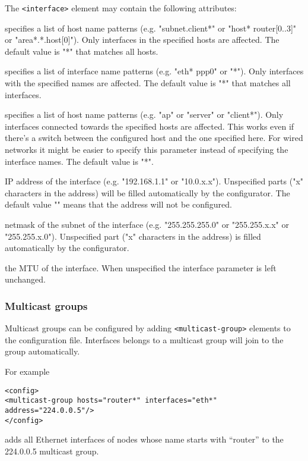 The \verb!<interface>! element may contain the following attributes:
\begin{compactitem}
 \item {} specifies a list of host name patterns
  (e.g. "subnet.client*" or "host* router[0..3]" or "area*.*.host[0]").
   Only interfaces in the specified hosts are affected. The default
   value is "*" that matches all hosts.

 \item {} specifies a list of interface name patterns
   (e.g. "eth* ppp0" or "*"). Only interfaces with the specified
   names are affected. The default value is "*" that matches all interfaces.

 \item {} specifies a list of host name patterns
   (e.g. "ap" or "server" or "client*").
   Only interfaces connected towards the specified hosts are affected.
   This works even if there's a switch between the configured host and
   the one specified here.
   For wired networks it might be easier to specify this parameter instead
   of specifying the interface names. The default value is "*".

 \item {} IP address of the interface (e.g. "192.168.1.1" or
   "10.0.x.x").
   Unspecified parts ("x" characters in the address) will be filled
   automatically by the configurator. The default value "" means that
   the address will not be configured.

 \item {} netmask of the subnet of the interface (e.g.
   "255.255.255.0" or "255.255.x.x" or "255.255.x.0").
   Unspecified part ("x" characters in the address) is filled automatically
   by the configurator.

 \item {} the MTU of the interface.
   When unspecified the interface parameter is left unchanged.
\end{compactitem}


\subsubsection{Multicast groups}

Multicast groups can be configured by adding \verb!<multicast-group>!
elements to the configuration file. Interfaces belongs to a multicast
group will join to the group automatically.

For example
\begin{verbatim}
<config>
<multicast-group hosts="router*" interfaces="eth*" address="224.0.0.5"/>
</config>
\end{verbatim}
adds all Ethernet interfaces of nodes whose name starts with ``router''
to the 224.0.0.5 multicast group.

